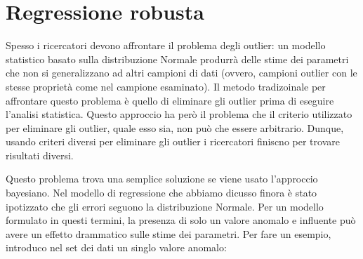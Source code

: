 \documentclass[
]{memoir}
\newenvironment{Shaded}{\begin{snugshade}}{\end{snugshade}}
\newcommand{\CommentTok}[1]{\textcolor[rgb]{0.56,0.35,0.01}{\textit{#1}}}
\newcommand{\DecValTok}[1]{\textcolor[rgb]{0.00,0.00,0.81}{#1}}
\newcommand{\FunctionTok}[1]{\textcolor[rgb]{0.00,0.00,0.00}{#1}}
\newcommand{\NormalTok}[1]{#1}
\newcommand{\OtherTok}[1]{\textcolor[rgb]{0.56,0.35,0.01}{#1}}
\newcommand{\SpecialCharTok}[1]{\textcolor[rgb]{0.00,0.00,0.00}{#1}}
\begin{document}
\begin{Shaded}
\end{Shaded}

\hypertarget{regressione-robusta}{%
\section{Regressione robusta}\label{regressione-robusta}}

Spesso i ricercatori devono affrontare il problema degli outlier: un modello statistico basato sulla distribuzione Normale produrrà delle stime dei parametri che non si generalizzano ad altri campioni di dati (ovvero, campioni outlier con le stesse proprietà come nel campione esaminato). Il metodo tradizoinale per affrontare questo problema è quello di eliminare gli outlier prima di eseguire l'analisi statistica. Questo approccio ha però il problema che il criterio utilizzato per eliminare gli outlier, quale esso sia, non può che essere arbitrario. Dunque, usando criteri diversi per eliminare gli outlier i ricercatori finiscno per trovare risultati diversi.

Questo problema trova una semplice soluzione se viene usato l'approccio bayesiano. Nel modello di regressione che abbiamo dicusso finora è stato ipotizzato che gli errori seguono la distribuzione Normale. Per un modello formulato in questi termini, la presenza di solo un valore anomalo e influente può avere un effetto drammatico sulle stime dei parametri. Per fare un esempio, introduco nel set dei dati un singlo valore anomalo:

\begin{Shaded}
\end{Shaded}
\end{document}
